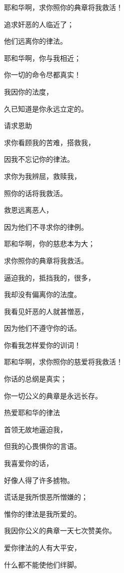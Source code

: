 {\par }{\Q 耶和华啊，求你照你的典章将我救活！
\par }{\Q {}追求奸恶的人临近了；
\par }{\Q 他们远离你的律法。
\par }{\Q {}耶和华啊，你与我相近；
\par }{\Q 你一切的命令尽都真实！
\par }{\Q {}我因{}你的法度，
\par }{\Q 久已知道是你永远立定的。
\par }{\SH 请求恩助
\par }{\Q {}求你看顾我的苦难，搭救我，
\par }{\Q 因我不忘记你的律法。
\par }{\Q {}求你为我辨屈，救赎我，
\par }{\Q 照你的话将我救活。
\par }{\Q {}救恩远离恶人，
\par }{\Q 因为他们不寻求你的律例。
\par }{\Q {}耶和华啊，你的慈悲本为大；
\par }{\Q 求你照你的典章将我救活。
\par }{\Q {}逼迫我的，抵挡我的，很多，
\par }{\Q 我却没有偏离你的法度。
\par }{\Q {}我看见奸恶的人就甚憎恶，
\par }{\Q 因为他们不遵守你的话。
\par }{\Q {}你看我怎样爱你的训词！
\par }{\Q 耶和华啊，求你照你的慈爱将我救活！
\par }{\Q {}你话的总纲是真实；
\par }{\Q 你一切公义的典章是永远长存。
\par }{\SH 热爱耶和华的律法
\par }{\Q {}首领无故地逼迫我，
\par }{\Q 但我的心畏惧你的言语。
\par }{\Q {}我喜爱你的话，
\par }{\Q 好像人得了许多掳物。
\par }{\Q {}谎话是我所恨恶所憎嫌的；
\par }{\Q 惟你的律法是我所爱的。
\par }{\Q {}我因你公义的典章一天七次赞美你。
\par }{\Q {}爱你律法的人有大平安，
\par }{\Q 什么都不能使他们绊脚。
}
